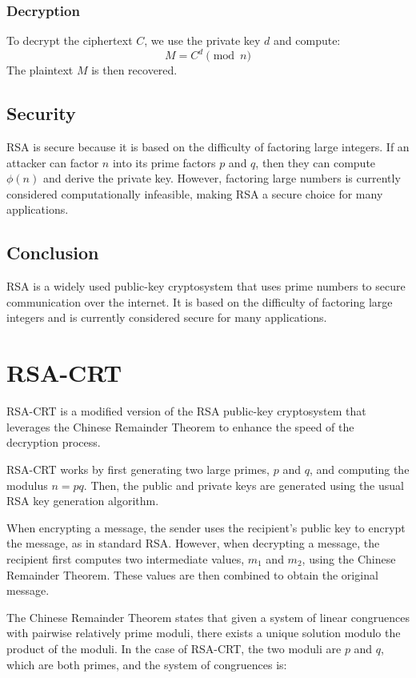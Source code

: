 \documentclass[12pt,openany]{book}
\theoremstyle{definition}
\begin{document}
	\subsubsection{Decryption}
	To decrypt the ciphertext $C$, we use the private key $d$ and compute:
	$$M = C^d \pmod{n}$$
	The plaintext $M$ is then recovered.
	
	\subsection{Security}
	RSA is secure because it is based on the difficulty of factoring large integers. If an attacker can factor $n$ into its prime factors $p$ and $q$, then they can compute $\phi(n)$ and derive the private key. However, factoring large numbers is currently considered computationally infeasible, making RSA a secure choice for many applications.
	
	\subsection{Conclusion}
	RSA is a widely used public-key cryptosystem that uses prime numbers to secure communication over the internet. It is based on the difficulty of factoring large integers and is currently considered secure for many applications.
	
	
	\section{RSA-CRT}
	
	RSA-CRT is a modified version of the RSA public-key cryptosystem that leverages the Chinese Remainder Theorem to enhance the speed of the decryption process.
	
	RSA-CRT works by first generating two large primes, $p$ and $q$, and computing the modulus $n=pq$. Then, the public and private keys are generated using the usual RSA key generation algorithm.
	
	When encrypting a message, the sender uses the recipient's public key to encrypt the message, as in standard RSA. However, when decrypting a message, the recipient first computes two intermediate values, $m_1$ and $m_2$, using the Chinese Remainder Theorem. These values are then combined to obtain the original message.
	
	The Chinese Remainder Theorem states that given a system of linear congruences with pairwise relatively prime moduli, there exists a unique solution modulo the product of the moduli. In the case of RSA-CRT, the two moduli are $p$ and $q$, which are both primes, and the system of congruences is:
	
\end{document}
